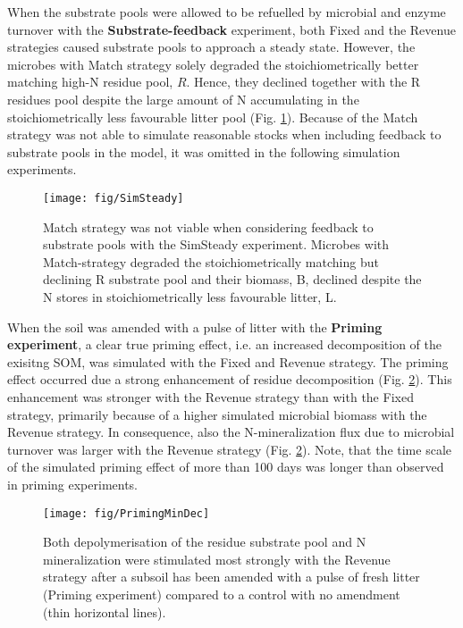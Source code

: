 When the substrate pools were allowed to be refuelled by microbial and enzyme
turnover with the \textbf{Substrate-feedback} experiment, both Fixed and the Revenue
strategies caused substrate pools to approach a steady state.
However, the microbes with Match strategy solely degraded the stoichiometrically
better matching high-N residue pool, $R$. Hence, they declined together with the
R residues pool despite the large amount of N accumulating in the
stoichiometrically less favourable litter pool (Fig. \ref{fig:SimSteady}).
Because of the Match strategy was not able to simulate reasonable stocks when
including feedback to substrate pools in the model, it was omitted in the
following simulation experiments.

\begin{figure}[t]
\vspace*{2mm}
\begin{center} 
\texttt{[image: fig/SimSteady]} 
\end{center}
\caption{
Match strategy was not viable when considering feedback to
substrate pools with the SimSteady experiment. Microbes with
Match-strategy degraded the stoichiometrically matching but declining R
substrate pool and their biomass, B, declined despite the N stores
in stoichiometrically less favourable litter, L.
\label{fig:SimSteady}} 
\end{figure}

When the soil was amended with a pulse of litter with the \textbf{Priming
experiment}, a clear true priming effect, i.e. an increased decomposition of the
exisitng SOM, was simulated with the Fixed and Revenue strategy.
The priming effect occurred due a strong enhancement of residue decomposition
(Fig. \ref{fig:PrimingMinDec}). This
enhancement was stronger with the Revenue strategy than with the Fixed strategy,
primarily because of a higher simulated microbial biomass with the Revenue
strategy. In consequence, also the N-mineralization flux due to microbial
turnover was larger with the Revenue strategy (Fig. \ref{fig:PrimingMinDec}).
Note, that the time scale of the simulated priming effect of more than 100 days
was longer than observed in priming experiments.

\begin{figure}[t] \vspace*{2mm}
\begin{center}
\texttt{[image: fig/PrimingMinDec]}
\end{center}
\caption{
Both depolymerisation of the residue substrate pool and N
mineralization were stimulated most strongly with the Revenue strategy after a
subsoil has been amended with a pulse of fresh litter (Priming experiment)
compared to a control with no amendment (thin horizontal lines).
\label{fig:PrimingMinDec}}
\end{figure}

